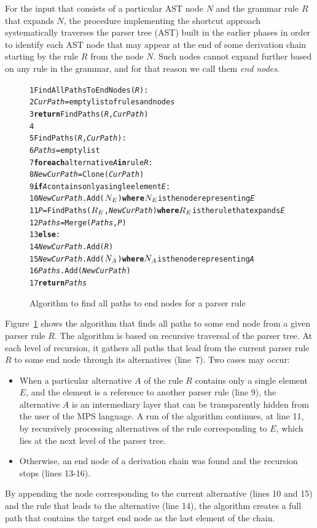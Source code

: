 For the input that consists of a particular AST node $N$ and the grammar rule $R$ that expands $N$, the procedure implementing the shortcut approach systematically traverses the parser tree (AST) built in the earlier phases in order to identify each AST node that may appear at the end of some derivation chain starting by the rule $R$ from the node $N$.
Such nodes cannot expand further based on any rule in the grammar, and for that reason we call them \emph{end nodes}.

\begin{figure}[ht]
\begin{framed}
\begin{alltt}
 1 FindAllPathsToEndNodes(\textit{R}):
 2   \textit{CurPath} = empty list of rules and nodes
 3   \textbf{return} FindPaths(\textit{R}, \textit{CurPath})
 4
 5 FindPaths(\textit{R}, \textit{CurPath}):
 6  \textit{Paths} = empty list
 7  \textbf{for each} alternative \textit{A} \textbf{in} rule \textit{R}:
 8    \textit{NewCurPath} = Clone(\textit{CurPath})
 9    \textbf{if} \textit{A} contains only a single element \textit{E}:
10      \textit{NewCurPath}.Add(\(N\sb{E}\)) \textbf{where} \(N\sb{E}\) is the node representing \textit{E}
11      \textit{P} = FindPaths(\(R\sb{E}\), \textit{NewCurPath}) \textbf{where} \(R\sb{E}\) is the rule that expands \textit{E}
12      \textit{Paths} = Merge(\textit{Paths}, \textit{P})
13    \textbf{else}:
14      \textit{NewCurPath}.Add(\textit{R})
15      \textit{NewCurPath}.Add(\(N\sb{A}\)) \textbf{where} \(N\sb{A}\) is the node representing \textit{A}
16      \textit{Paths}.Add(\textit{NewCurPath})
17  \textbf{return} \textit{Paths}
\end{alltt}
\end{framed}
\caption{Algorithm to find all paths to end nodes for a parser rule}
\label{fig:SHORTCUTALG}
\end{figure}

Figure~\ref{fig:SHORTCUTALG} shows the algorithm that finds all paths to some end node from a given parser rule $R$.
The algorithm is based on recursive traversal of the parser tree.
At each level of recursion, it gathers all paths that lead from the current parser rule $R$ to some end node through its alternatives (line~7).
Two cases may occur:
\begin{itemize}
	\item When a particular alternative $A$ of the rule $R$ contains only a single element $E$, and the element is a reference to another parser rule (line 9), the alternative $A$ is an intermediary layer that can be transparently hidden from the user of the MPS language.
		  A run of the algorithm continues, at line 11, by recursively processing alternatives of the rule corresponding to $E$, which lies at the next level of the parser tree.
	\item Otherwise, an end node of a derivation chain was found and the recursion stops (lines 13-16).
\end{itemize}
By appending the node corresponding to the current alternative (lines 10 and 15) and the rule that leads to the alternative (line 14), the algorithm creates a full path that contains the target end node as the last element of the chain.

